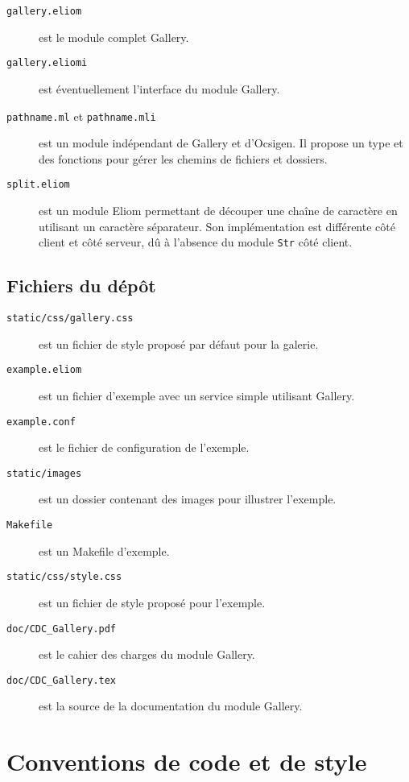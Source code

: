 \documentclass{life-fr}
\begin{document}
\begin{description}
  \item[\texttt{gallery.eliom}]
    est le module complet Gallery.
  \item[\texttt{gallery.eliomi}]
    est éventuellement l'interface du module Gallery.
  \item[\texttt{pathname.ml} et \texttt{pathname.mli}]
    est un module indépendant de Gallery et d'Ocsigen. Il
    propose un type et des fonctions pour gérer les chemins
    de fichiers et dossiers.
  \item[\texttt{split.eliom}]
    est un module Eliom permettant de découper une chaîne de
    caractère en utilisant un caractère séparateur. Son
    implémentation est différente côté client et côté serveur,
    dû à l'absence du module \texttt{Str} côté client.
\end{description}

\subsection{Fichiers du dépôt}

\begin{description}
  \item[\texttt{static/css/gallery.css}]
    est un fichier de style proposé par défaut pour la galerie.
  \item[\texttt{example.eliom}]
    est un fichier d'exemple avec un service simple utilisant
    Gallery.
  \item[\texttt{example.conf}]
    est le fichier de configuration de l'exemple.
  \item[\texttt{static/images}]
    est un dossier contenant des images pour illustrer
    l'exemple.
  \item[\texttt{Makefile}]
    est un Makefile d'exemple.
  \item[\texttt{static/css/style.css}]
    est un fichier de style proposé pour l'exemple.
  \item[\texttt{doc/CDC\_Gallery.pdf}]
    est le cahier des charges du module Gallery.
  \item[\texttt{doc/CDC\_Gallery.tex}]
    est la source de la documentation du module Gallery.
\end{description}

\section{Conventions de code et de style}
\end{document}
